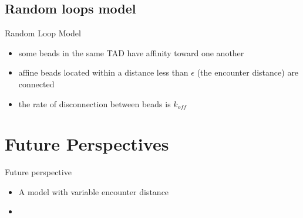 \documentclass[8pt]{beamer}
\begin{document}
\subsection{Random loops model}
\begin{frame}{Random Loop Model}
\begin{itemize}
\item some beads in the same TAD have affinity toward one another
\item affine beads located within a distance less than $\epsilon$ (the encounter distance) are connected
\item the rate of disconnection between beads is $k_{off}$
\end{itemize}
\end{frame}

\section{Future Perspectives}
\begin{frame}{Future perspective}
\begin{itemize}
\item A model with variable encounter distance
\item 
\end{itemize}
\end{frame}
\end{document}
